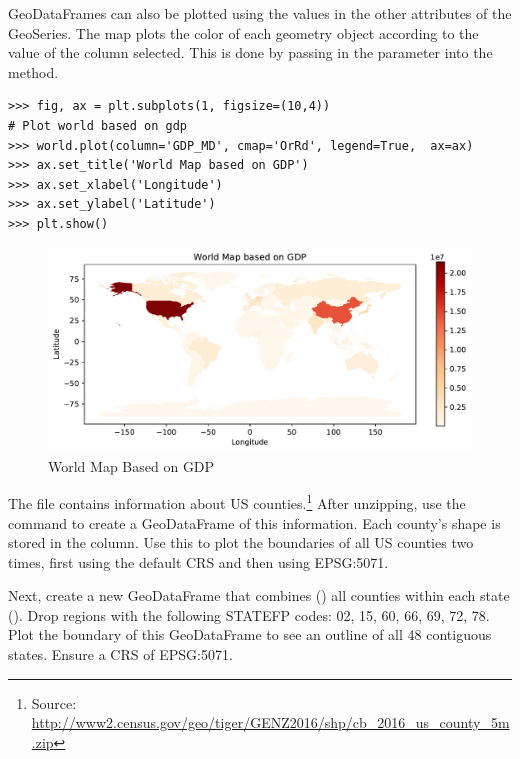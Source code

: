 GeoDataFrames can also be plotted using the values in the other attributes of the GeoSeries.
The map plots the color of each geometry object according to the value of the column selected.
This is done by passing in the parameter  into the  method.

\begin{lstlisting}
>>> fig, ax = plt.subplots(1, figsize=(10,4))
# Plot world based on gdp
>>> world.plot(column='GDP_MD', cmap='OrRd', legend=True,  ax=ax)
>>> ax.set_title('World Map based on GDP')
>>> ax.set_xlabel('Longitude')
>>> ax.set_ylabel('Latitude')
>>> plt.show()
\end{lstlisting}

\begin{figure}[H]
\begin{center}
\includegraphics[scale=.7]{figures/gdp.pdf}
\end{center}
\caption{World Map Based on GDP}
\label{figure:gdp_map}
\end{figure}


\begin{problem}
The file  contains information about US counties.\footnote{Source: \url{http://www2.census.gov/geo/tiger/GENZ2016/shp/cb_2016_us_county_5m.zip}}
After unzipping, use the command  to create a GeoDataFrame of this information.
Each county's shape is stored in the  column.
Use this to plot the boundaries of all US counties two times, first using the default CRS and then using EPSG:5071.

Next, create a new GeoDataFrame that combines () all counties within each state ().
Drop regions with the following STATEFP codes: 02, 15, 60, 66, 69, 72, 78.
Plot the boundary of this GeoDataFrame to see an outline of all 48 contiguous states.
Ensure a CRS of EPSG:5071.
\label{problem:us_counties}
\end{problem}


